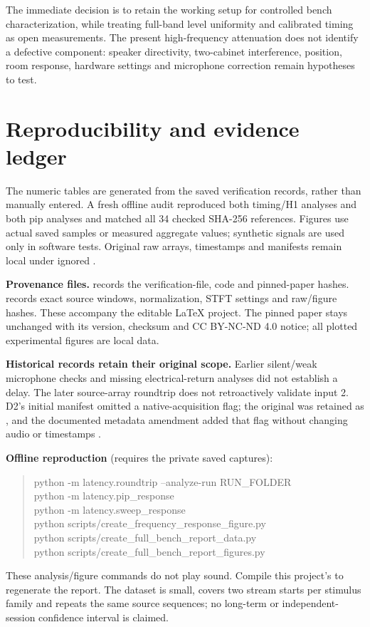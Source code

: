 \documentclass[11pt,letterpaper]{article}
\begin{document}
The immediate decision is to retain the working setup for controlled bench
characterization, while treating full-band level uniformity and calibrated timing
as open measurements. The present high-frequency attenuation does not identify
a defective component: speaker directivity, two-cabinet interference, position,
room response, hardware settings and microphone correction remain hypotheses to test.

\newpage
\section{Reproducibility and evidence ledger}
The numeric tables are generated from the saved verification records, rather
than manually entered. A fresh offline audit reproduced both timing/H1 analyses
and both pip analyses and matched all 34 checked SHA-256 references. Figures use
actual saved samples or measured aggregate values; synthetic signals are used
only in software tests. Original raw arrays, timestamps and manifests remain
local under ignored .

\textbf{Provenance files.}  records the verification-file,
code and pinned-paper hashes.  records exact
source windows, normalization, STFT settings and raw/figure hashes. These accompany
the editable LaTeX project. The pinned paper stays unchanged with its version,
checksum and CC BY-NC-ND 4.0 notice; all plotted experimental figures are local data.

\textbf{Historical records retain their original scope.} Earlier silent/weak
microphone checks and missing electrical-return analyses did not establish a delay.
The later source-array roundtrip does not retroactively validate input 2. D2's
initial manifest omitted a native-acquisition flag; the original was retained as
, and the documented metadata amendment added that
flag without changing audio or timestamps \cite{delay}.

\textbf{Offline reproduction} (requires the private saved captures):
\begin{quote}\small\ttfamily
python -m latency.roundtrip --analyze-run RUN\_FOLDER\\
python -m latency.pip\_response\\
python -m latency.sweep\_response\\
python scripts/create\_frequency\_response\_figure.py\\
python scripts/create\_full\_bench\_report\_data.py\\
python scripts/create\_full\_bench\_report\_figures.py
\end{quote}
These analysis/figure commands do not play sound. Compile this project's
 to regenerate the report. The dataset is small, covers two
stream starts per stimulus family and repeats the same source sequences; no
long-term or independent-session confidence interval is claimed.
\end{document}
